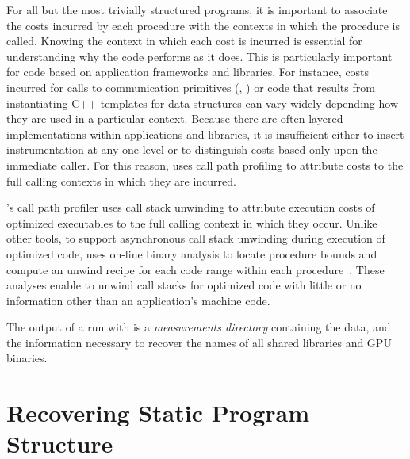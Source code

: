 \documentclass[11pt,twoside,letterpaper]{report}
\begin{document}
For all but the most trivially structured programs, it is important to associate the costs incurred by each procedure with the contexts in which the procedure is called.
Knowing the context in which each cost is incurred is essential for understanding why the code performs as it does.
This is particularly important for code based on application frameworks and libraries.
For instance, costs incurred for calls to communication primitives (\eg{}, ) or code that results from instantiating C++ templates for data structures can vary widely depending how they are used in a particular context.
Because there are often layered implementations within applications and libraries, it is insufficient either to insert instrumentation at any one level or to distinguish costs based only upon the immediate caller.
For this reason, \HPCToolkit{} uses call path profiling to attribute costs to the full calling contexts in which they are incurred.

\HPCToolkit{}'s \hpcrun{} call path profiler uses call stack unwinding to attribute execution costs of optimized executables to the full calling context in which they occur.
Unlike other tools, to support asynchronous call stack unwinding during execution of optimized code, \hpcrun{} uses on-line binary analysis to locate procedure bounds and compute an unwind recipe for each code range within each procedure~\cite{Tallent-MC-Fagan:2009:PLDI-hpctoolkit-binary-analysis}.
These analyses enable \hpcrun{} to unwind call stacks for optimized code with little or no information other than an application's machine code.

The output of a run with  \hpcrun{} is a \emph{measurements directory} containing the data, and the information necessary
to recover the names of all shared libraries and GPU binaries.


\section{Recovering Static Program Structure}
\end{document}
